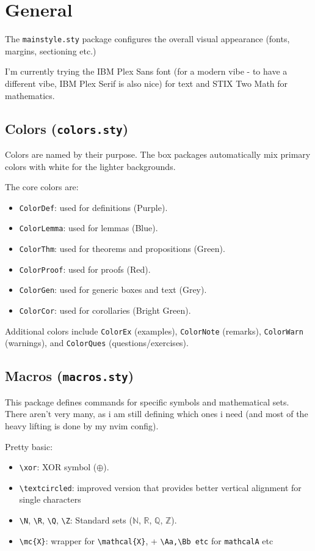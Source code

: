 \documentclass[a4paper,12pt]{report}
\begin{document}
\makecustomcover

\tableofcontents

\chapter{General}

The \texttt{mainstyle.sty} package configures the overall visual appearance (fonts, margins, sectioning etc.)

I'm currently trying the IBM Plex Sans font (for a modern vibe - to have a different vibe, IBM Plex Serif is also nice) for text and STIX Two Math for mathematics.

\section{Colors (\texttt{colors.sty})}
Colors are named by their purpose. The box packages automatically mix primary colors with white for the lighter backgrounds.

The core colors are:
\begin{itemize}
    \item \texttt{ColorDef}: used for definitions (Purple).
    \item \texttt{ColorLemma}: used for lemmas (Blue).
    \item \texttt{ColorThm}: used for theorems and propositions (Green).
    \item \texttt{ColorProof}: used for proofs (Red).
    \item \texttt{ColorGen}: used for generic boxes and text (Grey).
    \item \texttt{ColorCor}: used for corollaries (Bright Green).
\end{itemize}
Additional colors include \texttt{ColorEx} (examples), \texttt{ColorNote} (remarks), \texttt{ColorWarn} (warnings), and \texttt{ColorQues} (questions/exercises).

\section{Macros (\texttt{macros.sty})}

This package defines commands for specific symbols and mathematical sets. There aren't very many, as i am still defining which ones i need (and most of the heavy lifting is done by my nvim config).

Pretty basic:
\begin{itemize}
    \item \texttt{\textbackslash xor}: XOR symbol ($\oplus$).
    \item \texttt{\textbackslash textcircled}: improved version that provides better vertical alignment for single characters
    \item \texttt{\textbackslash N}, \texttt{\textbackslash R}, \texttt{\textbackslash Q}, \texttt{\textbackslash Z}: Standard sets ($\mathbb{N}$, $\mathbb{R}$, $\mathbb{Q}$, $\mathbb{Z}$).
    \item \texttt{\textbackslash mc\{X\}}: wrapper for \texttt{\textbackslash mathcal\{X\}}, + \texttt{\textbackslash Aa,\textbackslash Bb etc} for \texttt{mathcal{A}} etc  
\end{itemize}
\end{document}
